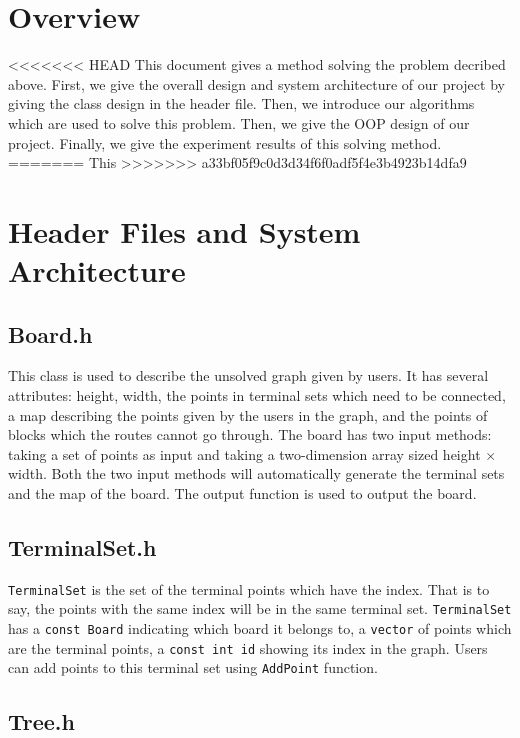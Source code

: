 \documentclass[12pt, a4paper]{article}
\begin{document}
	\section{Overview}
	
<<<<<<< HEAD
		This document gives a method solving the problem decribed above. First, we give the overall design and system architecture of our project by giving the class design in the header file. Then, we introduce our algorithms which are used to solve this problem. Then, we give the OOP design of our project. Finally, we give the experiment results of this solving method.
=======
		This 
>>>>>>> a33bf05f9c0d3d34f6f0adf5f4e3b4923b14dfa9
	
	\section{Header Files and System Architecture}
	
		\subsection{Board.h}
		
			This class is used to describe the unsolved graph given by users. It has several attributes: height, width, the points in terminal sets which need to be connected, a map describing the points given by the users in the graph, and the points of blocks which the routes cannot go through. The board has two input methods: taking a set of points as input and taking a two-dimension array sized height $\times$ width. Both the two input methods will automatically generate the terminal sets and the map of the board. The output function is used to output the board.
		
		\subsection{TerminalSet.h}
		
			\texttt{TerminalSet} is the set of the terminal points which have the index. That is to say, the points with the same index will be in the same terminal set. \texttt{TerminalSet} has a \texttt{const Board} indicating which board it belongs to, a \texttt{vector} of points which are the terminal points, a \texttt{const int id} showing its index in the graph. Users can add points to this terminal set using \texttt{AddPoint} function.
				
		\subsection{Tree.h}
\end{document}
